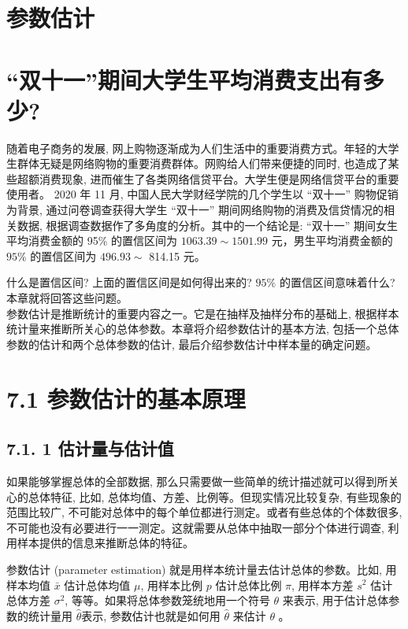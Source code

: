 \documentclass[10pt]{article}
\begin{document}
\begin{CJK*}{UTF8}{bsmi}
\begin{center}
\end{center}

\section*{参数估计}
\begin{center}
\end{center}

\section*{“双十一”期间大学生平均消费支出有多少?}
随着电子商务的发展, 网上购物逐渐成为人们生活中的重要消费方式。年轻的大学生群体无疑是网络购物的重要消费群体。网购给人们带来便捷的同时, 也造成了某些超额消费现象, 进而催生了各类网络信贷平台。大学生便是网络信贷平台的重要使用者。 2020 年 11 月, 中国人民大学财经学院的几个学生以 “双十一” 购物促销为背景, 通过问卷调查获得大学生 “双十一” 期间网络购物的消费及信贷情况的相关数据, 根据调查数据作了多角度的分析。其中的一个结论是: “双十一” 期间女生平均消费金额的 95\% 的置信区间为 $1063.39 \sim 1501.99$ 元，男生平均消费金额的 $95 \%$ 的置信区间为 $496.93 \sim$ 814.15 元。

什么是置信区间? 上面的置信区间是如何得出来的? $95 \%$ 的置信区间意味着什么?本章就将回答这些问题。\\
参数估计是推断统计的重要内容之一。它是在抽样及抽样分布的基础上, 根据样本统计量来推断所关心的总体参数。本章将介绍参数估计的基本方法, 包括一个总体参数的估计和两个总体参数的估计, 最后介绍参数估计中样本量的确定问题。

\section*{7.1 参数估计的基本原理}
\subsection*{7.1. 1 估计量与估计值}
如果能够掌握总体的全部数据, 那么只需要做一些简单的统计描述就可以得到所关心的总体特征, 比如, 总体均值、方差、比例等。但现实情况比较复杂, 有些现象的范围比较广, 不可能对总体中的每个单位都进行测定。或者有些总体的个体数很多, 不可能也没有必要进行一一测定。这就需要从总体中抽取一部分个体进行调查, 利用样本提供的信息来推断总体的特征。

参数估计 (parameter estimation) 就是用样本统计量去估计总体的参数。比如, 用样本均值 $\bar{x}$ 估计总体均值 $\mu$, 用样本比例 $p$ 估计总体比例 $\pi$, 用样本方差 $s^{2}$ 估计总体方差 $\sigma^{2}$, 等等。如果将总体参数笼统地用一个符号 $\theta$ 来表示, 用于估计总体参数的统计量用 $\hat{\theta}$表示, 参数估计也就是如何用 $\hat{\theta}$ 来估计 $\theta$ 。


\end{CJK*}
\end{document}
